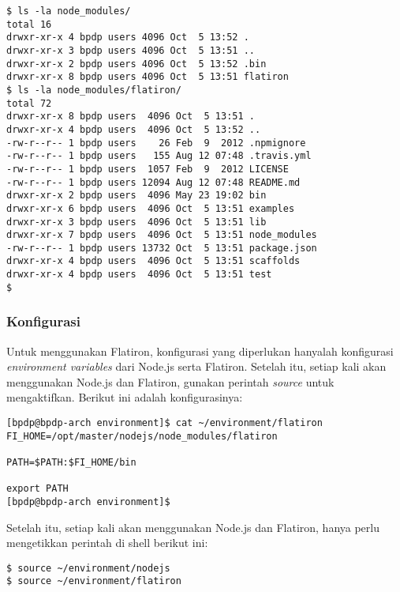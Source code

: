 \lstset{language=bash,caption=Hasil instalasi Flatiron}
\begin{lstlisting}
$ ls -la node_modules/
total 16
drwxr-xr-x 4 bpdp users 4096 Oct  5 13:52 .
drwxr-xr-x 3 bpdp users 4096 Oct  5 13:51 ..
drwxr-xr-x 2 bpdp users 4096 Oct  5 13:52 .bin
drwxr-xr-x 8 bpdp users 4096 Oct  5 13:51 flatiron
$ ls -la node_modules/flatiron/
total 72
drwxr-xr-x 8 bpdp users  4096 Oct  5 13:51 .
drwxr-xr-x 4 bpdp users  4096 Oct  5 13:52 ..
-rw-r--r-- 1 bpdp users    26 Feb  9  2012 .npmignore
-rw-r--r-- 1 bpdp users   155 Aug 12 07:48 .travis.yml
-rw-r--r-- 1 bpdp users  1057 Feb  9  2012 LICENSE
-rw-r--r-- 1 bpdp users 12094 Aug 12 07:48 README.md
drwxr-xr-x 2 bpdp users  4096 May 23 19:02 bin
drwxr-xr-x 6 bpdp users  4096 Oct  5 13:51 examples
drwxr-xr-x 3 bpdp users  4096 Oct  5 13:51 lib
drwxr-xr-x 7 bpdp users  4096 Oct  5 13:51 node_modules
-rw-r--r-- 1 bpdp users 13732 Oct  5 13:51 package.json
drwxr-xr-x 4 bpdp users  4096 Oct  5 13:51 scaffolds
drwxr-xr-x 4 bpdp users  4096 Oct  5 13:51 test
$ 
\end{lstlisting}

\subsubsection{Konfigurasi}

Untuk menggunakan Flatiron, konfigurasi yang diperlukan hanyalah konfigurasi \textit{environment variables} dari Node.js serta Flatiron. Setelah itu, setiap kali akan menggunakan Node.js dan Flatiron, gunakan perintah \textit{source} untuk mengaktifkan. Berikut ini adalah konfigurasinya:

\lstset{language=bash,caption=Variabel lingkungan dari Flatiron}
\begin{lstlisting}
[bpdp@bpdp-arch environment]$ cat ~/environment/flatiron 
FI_HOME=/opt/master/nodejs/node_modules/flatiron

PATH=$PATH:$FI_HOME/bin

export PATH
[bpdp@bpdp-arch environment]$ 
\end{lstlisting}

Setelah itu, setiap kali akan menggunakan Node.js dan Flatiron, hanya perlu mengetikkan perintah di shell berikut ini:

\lstset{language=bash,caption=Mengaktifkan Node.js dan Flatiron}
\begin{lstlisting}
$ source ~/environment/nodejs
$ source ~/environment/flatiron
\end{lstlisting}

